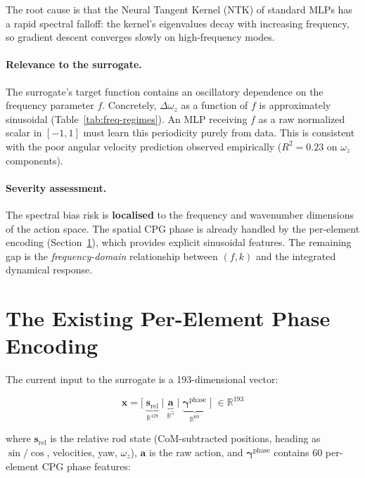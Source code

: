 \documentclass[11pt]{article}
\newcommand{\vect}[1]{\mathbf{#1}}
\newcommand{\Real}{\mathbb{R}}
\begin{document}
The root cause is that the Neural Tangent Kernel (NTK) of standard MLPs has a rapid
spectral falloff: the kernel's eigenvalues decay with increasing frequency, so
gradient descent converges slowly on high-frequency modes.

\paragraph{Relevance to the surrogate.}
The surrogate's target function contains an oscillatory dependence on the frequency
parameter $f$.
Concretely, $\Delta\omega_z$ as a function of $f$ is approximately sinusoidal
(Table~\ref{tab:freq-regimes}).
An MLP receiving $f$ as a raw normalized scalar in $[-1, 1]$ must learn this
periodicity purely from data.
This is consistent with the poor angular velocity prediction observed empirically
($R^2 = 0.23$ on $\omega_z$ components).

\paragraph{Severity assessment.}
The spectral bias risk is \textbf{localised} to the frequency and wavenumber
dimensions of the action space.
The spatial CPG phase is already handled by the per-element encoding (Section~\ref{sec:existing}),
which provides explicit sinusoidal features.
The remaining gap is the \emph{frequency-domain} relationship between $(f, k)$ and
the integrated dynamical response.

\section{The Existing Per-Element Phase Encoding}
\label{sec:existing}

The current input to the surrogate is a 193-dimensional vector:

\begin{equation}
  \vect{x} = \bigl[\;
    \underbrace{\vect{s}_{\mathrm{rel}}}_{\Real^{128}}
    \;\big|\;
    \underbrace{\vect{a}}_{\Real^{5}}
    \;\big|\;
    \underbrace{\vect{\gamma}^{\mathrm{phase}}}_{\Real^{60}}
  \;\bigr]
  \;\in \Real^{193}
  \label{eq:current-input}
\end{equation}

\noindent
where $\vect{s}_{\mathrm{rel}}$ is the relative rod state (CoM-subtracted positions,
heading as $\sin/\cos$, velocities, yaw, $\omega_z$), $\vect{a}$ is the raw action,
and $\vect{\gamma}^{\mathrm{phase}}$ contains 60 per-element CPG phase features:
\end{document}

